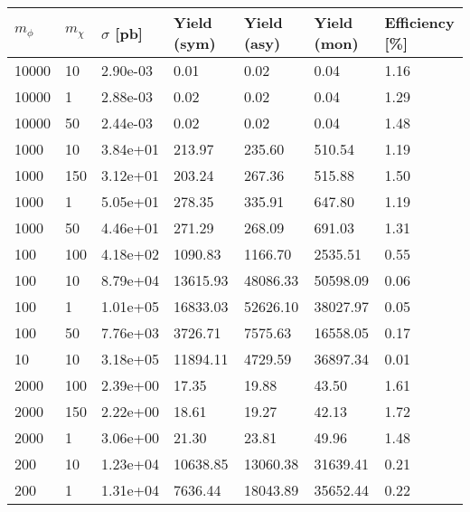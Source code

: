 \begin{table}
\small
\centering
\begin{tabular}{lllllll}
\hline
$m_\phi$ & $m_\chi$ & $\sigma$ [pb] & Yield (sym) & Yield (asy) & Yield (mon) & Efficiency [\%] \\ \hline
10000     &   10        &   2.90e-03  &   0.01      &   0.02      &   0.04      &   1.16      \\ 
10000     &   1         &   2.88e-03  &   0.02      &   0.02      &   0.04      &   1.29      \\ 
10000     &   50        &   2.44e-03  &   0.02      &   0.02      &   0.04      &   1.48      \\ 
1000      &   10        &   3.84e+01  &   213.97    &   235.60    &   510.54    &   1.19      \\ 
1000      &   150       &   3.12e+01  &   203.24    &   267.36    &   515.88    &   1.50      \\ 
1000      &   1         &   5.05e+01  &   278.35    &   335.91    &   647.80    &   1.19      \\ 
1000      &   50        &   4.46e+01  &   271.29    &   268.09    &   691.03    &   1.31      \\ 
100       &   100       &   4.18e+02  &   1090.83   &   1166.70   &   2535.51   &   0.55      \\ 
100       &   10        &   8.79e+04  &   13615.93  &   48086.33  &   50598.09  &   0.06      \\ 
100       &   1         &   1.01e+05  &   16833.03  &   52626.10  &   38027.97  &   0.05      \\ 
100       &   50        &   7.76e+03  &   3726.71   &   7575.63   &   16558.05  &   0.17      \\ 
10        &   10        &   3.18e+05  &   11894.11  &   4729.59   &   36897.34  &   0.01      \\ 
2000      &   100       &   2.39e+00  &   17.35     &   19.88     &   43.50     &   1.61      \\ 
2000      &   150       &   2.22e+00  &   18.61     &   19.27     &   42.13     &   1.72      \\ 
2000      &   1         &   3.06e+00  &   21.30     &   23.81     &   49.96     &   1.48      \\ 
200       &   10        &   1.23e+04  &   10638.85  &   13060.38  &   31639.41  &   0.21      \\ 
200       &   1         &   1.31e+04  &   7636.44   &   18043.89  &   35652.44  &   0.22      \\ 

\end{tabular}
\end{table}
